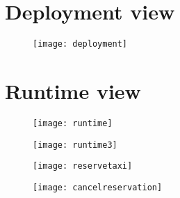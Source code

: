 \documentclass[12pt, oneside]{book}   	%
\begin{document}
\section{Deployment view}
\vspace{3cm}
\begin{figure}[h]
\center \texttt{[image: deployment]}
\end{figure}
\clearpage
\section{Runtime view}
\vspace{3cm}
\begin{figure}[h]
\center \texttt{[image: runtime]}
\end{figure}
\begin{figure}[h]
\center \texttt{[image: runtime3]}
\end{figure}
\clearpage
\begin{figure}[h]
\center \texttt{[image: reservetaxi]}
\end{figure}
\vspace{3cm}
\begin{figure}[h]
\center \texttt{[image: cancelreservation]}
\end{figure}
\end{document}
